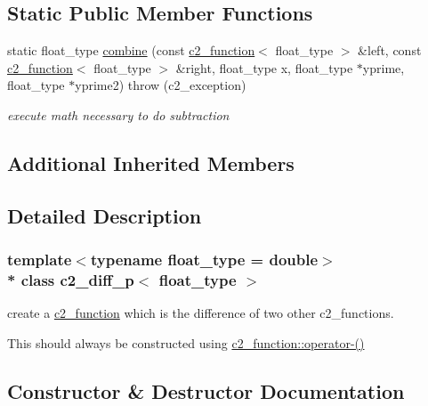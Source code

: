 \subsection*{Static Public Member Functions}
\begin{DoxyCompactItemize}
\item 
static float\+\_\+type \hyperlink{classc2__diff__p_ae6481f9c5fa1c245fd7c2ef5df096399}{combine} (const \hyperlink{classc2__function}{c2\+\_\+function}$<$ float\+\_\+type $>$ \&left, const \hyperlink{classc2__function}{c2\+\_\+function}$<$ float\+\_\+type $>$ \&right, float\+\_\+type x, float\+\_\+type $\ast$yprime, float\+\_\+type $\ast$yprime2)  throw (c2\+\_\+exception)
\begin{DoxyCompactList}\small\item\em execute math necessary to do subtraction \end{DoxyCompactList}\end{DoxyCompactItemize}
\subsection*{Additional Inherited Members}


\subsection{Detailed Description}
\subsubsection*{template$<$typename float\+\_\+type = double$>$\\*
class c2\+\_\+diff\+\_\+p$<$ float\+\_\+type $>$}

create a \hyperlink{classc2__function}{c2\+\_\+function} which is the difference of two other c2\+\_\+functions.

This should always be constructed using \hyperlink{classc2__function_a4c56a4673e00bfad37143c403a0c94c8}{c2\+\_\+function\+::operator-\/()} 

\subsection{Constructor \& Destructor Documentation}
